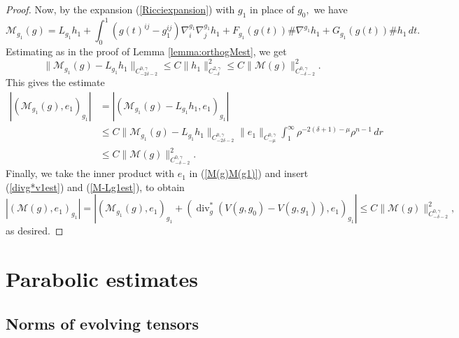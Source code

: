 \documentclass[12pt]{amsart}
\newcommand{\calM}{\mathcal{M}}
\renewcommand{\1}{{\mathbf 1}}
\renewcommand{\div}{{\operatorname{div} }}
\theoremstyle{others}
\numberwithin{equation}{section}
\begin{document}
\begin{proof}
Now, by the expansion (\ref{Ricciexpansion}) with $g_1$ in place of $g_0,$ we have
\begin{equation*}
    \calM_{g_1}(g) = L_{g_1} h_1 + \int_{0}^1 \left( g(t)^{ij} - g_1^{ij} \right)\nabla^{g_1}_i \nabla^{g_1}_j h_1 + F_{g_1}(g(t)) \# \nabla^{g_1} h_1 + G_{g_1}(g(t)) \# h_1 \, dt.
\end{equation*}
Estimating as in the proof of Lemma \ref{lemma:orthogMest}, we get
\begin{equation*}
    \| \calM_{g_1}(g) - L_{g_1} h_1 \|_{C^{0, \gamma}_{-2\delta - 2}} \leq C \|h_1\|^2_{C^{2, \gamma}_{-\delta}} \leq C \|\calM(g)\|^2_{C^{0, \gamma}_{-\delta - 2}}.
\end{equation*}
This gives the estimate
\begin{equation}\label{M-Lg1est}
\begin{split}
    \left| \left( \calM_{g_1}(g), e_1 \right)_{g_1} \right| & = \left| \left( \calM_{g_1}(g) - L_{g_1} h_1, e_1 \right)_{g_1} \right| \\
    & \leq C \|\calM_{g_1}(g) - L_{g_1} h_1 \|_{C^{0, \gamma}_{-2 \delta - 2}} \| e_1 \|_{C^{0, \gamma}_{-\mu}}\int_1^\infty \rho^{-2(\delta + 1) - \mu} \rho^{n-1} \, dr \\
    & \leq C \|\calM(g)\|^2_{C^{0, \gamma}_{-\delta - 2}}.
    \end{split}
\end{equation}
Finally, we take the inner product with $e_1$ in (\ref{M(g)M(g1)}) and insert (\ref{divg*v1est}) and (\ref{M-Lg1est}), to obtain
\begin{equation*}
    \left| \left( \calM(g), e_1 \right)_{g_1} \right| = \left| \left( \calM_{g_1}(g), e_1 \right)_{g_1} + \left( \div_g^*\left( V(g,g_0) - V(g,g_1) \right) , e_1 \right)_{g_1} \right| \leq C \|\calM(g)\|^2_{C^{0, \gamma}_{-\delta - 2}},
\end{equation*}
as desired.
\end{proof}




\vspace{10mm}




\section{Parabolic estimates} \label{sec: parabolic estimates}

\subsection{Norms of evolving tensors}
\end{document}
